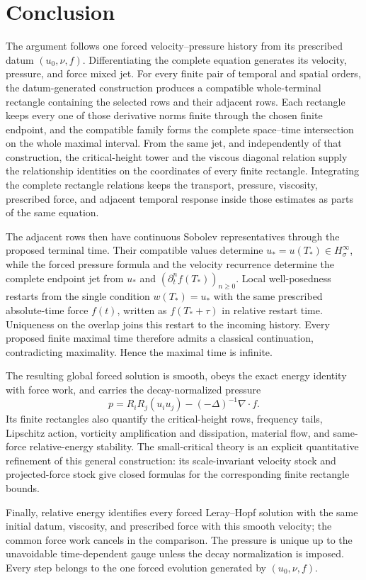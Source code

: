 \clearpage
\section{Conclusion}

The argument follows one forced velocity--pressure history from its prescribed
datum \((u_0,\nu,f)\). Differentiating the complete equation generates its
velocity, pressure, and force mixed jet. For every finite pair of temporal and
spatial orders, the datum-generated construction produces a compatible
whole-terminal rectangle containing the selected rows and their adjacent rows.
Each rectangle keeps every one of those derivative norms finite through the
chosen finite endpoint, and the compatible family forms the complete
space--time intersection on the whole maximal interval. From the same jet, and
independently of that construction, the critical-height tower and the viscous
diagonal relation supply the relationship identities on the coordinates of
every finite rectangle. Integrating the complete rectangle relations keeps
the transport, pressure, viscosity,
prescribed force, and adjacent temporal response inside those estimates
as parts of the same equation.

The adjacent rows then have continuous Sobolev representatives through the
proposed terminal time.  Their compatible values determine
\(u_*=u(T_*)\in H^\infty_\sigma\), while the forced pressure formula and the
velocity recurrence determine the complete endpoint jet from \(u_*\) and
\((\partial_t^nf(T_*))_{n\ge0}\).  Local well-posedness restarts from the
single condition \(w(T_*)=u_*\) with the same prescribed absolute-time force
\(f(t)\), written as \(f(T_*+\tau)\) in relative restart time.  Uniqueness on
the overlap joins this restart to the incoming history. Every proposed finite
maximal time therefore admits a classical continuation, contradicting
maximality. Hence the maximal time is infinite.

The resulting global forced solution is smooth, obeys the exact energy
identity with force work, and carries the decay-normalized pressure
\[
 p=R_iR_j(u_i u_j)-(-\Delta)^{-1}\nabla\cdot f.
\]
Its finite rectangles also quantify the critical-height rows, frequency
tails, Lipschitz action, vorticity amplification and dissipation, material
flow, and same-force relative-energy stability.  The small-critical theory is
an explicit quantitative refinement of this general construction: its
scale-invariant velocity stock and projected-force stock give closed formulas
for the corresponding finite rectangle bounds.

Finally, relative energy identifies every forced Leray--Hopf solution with the
same initial datum, viscosity, and prescribed force with this smooth velocity;
the common force work cancels in the comparison.  The pressure is unique up to
the unavoidable time-dependent gauge unless the decay normalization is
imposed.  Every step belongs to the one forced evolution generated by
\((u_0,\nu,f)\).
